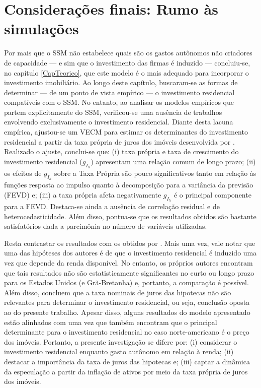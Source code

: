 \section{Considerações finais: Rumo às simulações}
\label{Conclucao_Empirica}


Por mais que o SSM não estabelece quais são os gastos autônomos não criadores de capacidade --- e sim que o investimento das firmas é induzido --- concluiu-se, no capítulo \ref{CapTeorico}, que este modelo é o mais adequado para incorporar o investimento imobiliário.
Ao longo deste capítulo, buscaram-se as formas de determinar --- de um ponto de vista empírico --- o investimento residencial compatíveis com o SSM.
No entanto, ao analisar os modelos empíricos que partem explicitamente do SSM, verificou-se uma ausência de trabalhos envolvendo exclusivamente o investimento residencial. 
Diante desta lacuna empírica, ajustou-se um VECM para estimar os determinantes do investimento residencial a partir da taxa própria de juros dos imóveis desenvolvida por \textcite{teixeira_crescimento_2015}. Realizado o ajuste, conclui-se que: 
(i) taxa própria e taxa de crescimento do investimento residencial ($g_{I_h}$) apresentam uma relação comum de longo prazo; 
(ii) os efeitos de $g_{I_h}$ sobre a Taxa Própria são pouco significativos tanto em relação às funções resposta ao impulso quanto à decomposição para a variância da previsão (FEVD) e;
(iii) a taxa própria afeta negativamente $g_{I_h}$ é o principal componente para a FEVD. 
Destaca-se ainda a ausência de correlação residual e de heterocedasticidade. Além disso, pontua-se que os resultados obtidos são bastante satisfatórios dada a parcimônia no número de variáveis utilizadas.

Resta contrastar os resultados com os obtidos por \textcite{arestis_residential_2015}. Mais uma vez, vale notar que uma das hipóteses dos autores é de que o investimento residencial é induzido uma vez que depende da renda disponível. No entanto, os próprios autores encontram que tais resultados não são estatisticamente significantes no curto ou longo prazo para os Estados Unidos (e Grã-Bretanha) e, portanto, a comparação é possível. Além disso, concluem que a taxa nominais de juros das hipotecas não são relevantes para determinar o investimento residencial, ou seja, conclusão oposta ao do presente trabalho. Apesar disso, alguns resultados do modelo apresentado estão alinhados com \textcite{arestis_residential_2015} uma vez que também encontram que o principal determinante para o investimento residencial no caso norte-americano é o preço dos imóveis. Portanto, a presente investigação se difere por: (i) considerar o investimento residencial enquanto gasto autônomo em relação à renda; (ii) destacar a importância da taxa de juros das hipotecas e; (iii) captar a dinâmica da especulação a partir da inflação de ativos por meio da taxa própria de juros dos imóveis.  

